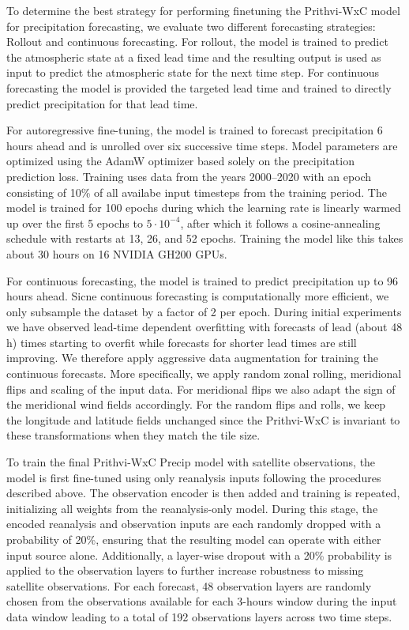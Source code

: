 \documentclass{ametsocV6.1}
\begin{document}
To determine the best strategy for performing finetuning the Prithvi-WxC model
for precipitation forecasting, we evaluate two different forecasting strategies:
Rollout and continuous forecasting. For rollout, the model is trained to predict
the atmospheric state at a fixed lead time and the resulting output is used as
input to predict the atmospheric state for the next time step. For continuous
forecasting the model is provided the targeted lead time and  trained to directly
predict precipitation for that lead time.

For autoregressive fine-tuning, the model is trained to forecast precipitation 6
hours ahead and is unrolled over six successive time steps. Model parameters are
optimized using the AdamW optimizer based solely on the precipitation prediction
loss. Training uses data from the years 2000–2020 with an epoch consisting of
10\% of all availabe input timesteps from the training period. The model is
trained for 100 epochs during which the learning rate is linearly warmed up over
the first 5 epochs to $5 \cdot 10^{-4}$, after which it follows a
cosine-annealing schedule with restarts at 13, 26, and 52 epochs. Training the
model like this takes about 30 hours on 16 NVIDIA GH200 GPUs.

For continuous forecasting, the model is trained to predict precipitation up to
96 hours ahead. Sicne continuous forecasting is computationally more efficient,
we only subsample the dataset by a factor of 2 per epoch. During initial
experiments we have observed lead-time dependent overfitting with forecasts of
lead (about 48 h) times starting to overfit while forecasts for shorter lead
times are still improving. We therefore apply aggressive data augmentation for
training the continuous forecasts. More specifically, we apply random zonal
rolling, meridional flips and scaling of the input data. For meridional flips we
also adapt the sign of the meridional wind fields accordingly. For the random
flips and rolls, we keep the longitude and latitude fields unchanged since the
Prithvi-WxC is invariant to these transformations when they match the tile size.

To train the final Prithvi-WxC Precip model with satellite observations, the
model is first fine-tuned using only reanalysis inputs following the procedures
described above. The observation encoder is then added and training is repeated,
initializing all weights from the reanalysis-only model. During this stage, the
encoded reanalysis and observation inputs are each randomly dropped with a
probability of 20\%, ensuring that the resulting model can operate with either
input source alone. Additionally, a layer-wise dropout with a 20\% probability
is applied to the observation layers to further increase robustness to missing
satellite observations. For each forecast, 48 observation layers are randomly
chosen from the observations available for each 3-hours window during the input
data window leading to a total of 192 observations layers across two time steps.
\end{document}
